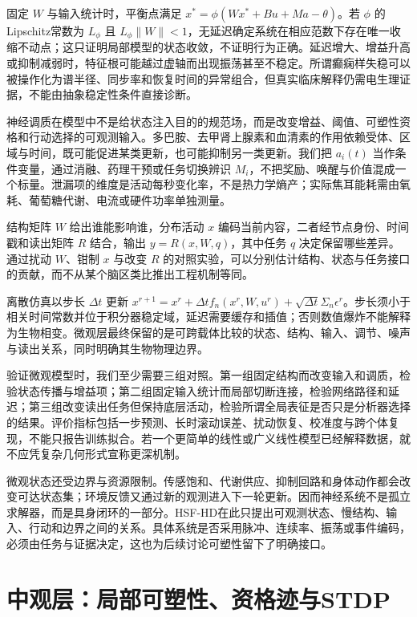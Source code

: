固定 $W$ 与输入统计时，平衡点满足 $x^*=\phi(Wx^*+Bu+Ma-\theta)$。若 $\phi$ 的Lipschitz常数为 $L_\phi$ 且 $L_\phi\|W\|<1$，无延迟确定系统在相应范数下存在唯一收缩不动点；这只证明局部模型的状态收敛，不证明行为正确。延迟增大、增益升高或抑制减弱时，特征根可能越过虚轴而出现振荡甚至不稳定。所谓癫痫样失稳可以被操作化为谱半径、同步率和恢复时间的异常组合，但真实临床解释仍需电生理证据，不能由抽象稳定性条件直接诊断。

神经调质在模型中不是给状态注入目的的规范场，而是改变增益、阈值、可塑性资格和行动选择的可观测输入。多巴胺、去甲肾上腺素和血清素的作用依赖受体、区域与时间，既可能促进某类更新，也可能抑制另一类更新。我们把 $a_i(t)$ 当作条件变量，通过消融、药理干预或任务切换辨识 $M_i$，不把奖励、唤醒与价值混成一个标量。泄漏项的维度是活动每秒变化率，不是热力学熵产；实际焦耳能耗需由氧耗、葡萄糖代谢、电流或硬件功率单独测量。

结构矩阵 $W$ 给出谁能影响谁，分布活动 $x$ 编码当前内容，二者经节点身份、时间戳和读出矩阵 $R$ 结合，输出 $y=R(x,W,q)$，其中任务 $q$ 决定保留哪些差异。通过扰动 $W$、钳制 $x$ 与改变 $R$ 的对照实验，可以分别估计结构、状态与任务接口的贡献，而不从某个脑区类比推出工程机制等同。

离散仿真以步长 $\Delta t$ 更新 $x^{r+1}=x^r+\Delta t f_n(x^r,W,u^r)+\sqrt{\Delta t}\Sigma_n\epsilon^r$。步长须小于相关时间常数并位于积分器稳定域，延迟需要缓存和插值；否则数值爆炸不能解释为生物相变。微观层最终保留的是可跨载体比较的状态、结构、输入、调节、噪声与读出关系，同时明确其生物物理边界。

验证微观模型时，我们至少需要三组对照。第一组固定结构而改变输入和调质，检验状态传播与增益项；第二组固定输入统计而局部切断连接，检验网络路径和延迟；第三组改变读出任务但保持底层活动，检验所谓全局表征是否只是分析器选择的结果。评价指标包括一步预测、长时滚动误差、扰动恢复、校准度与跨个体复现，不能只报告训练拟合。若一个更简单的线性或广义线性模型已经解释数据，就不应凭复杂几何形式宣称更深机制。

微观状态还受边界与资源限制。传感饱和、代谢供应、抑制回路和身体动作都会改变可达状态集；环境反馈又通过新的观测进入下一轮更新。因而神经系统不是孤立求解器，而是具身闭环的一部分。HSF-HD在此只提出可观测状态、慢结构、输入、行动和边界之间的关系。具体系统是否采用脉冲、连续率、振荡或事件编码，必须由任务与证据决定，这也为后续讨论可塑性留下了明确接口。

\section{中观层：局部可塑性、资格迹与STDP}
\label{sec:meso_cefe_and_stdp}

